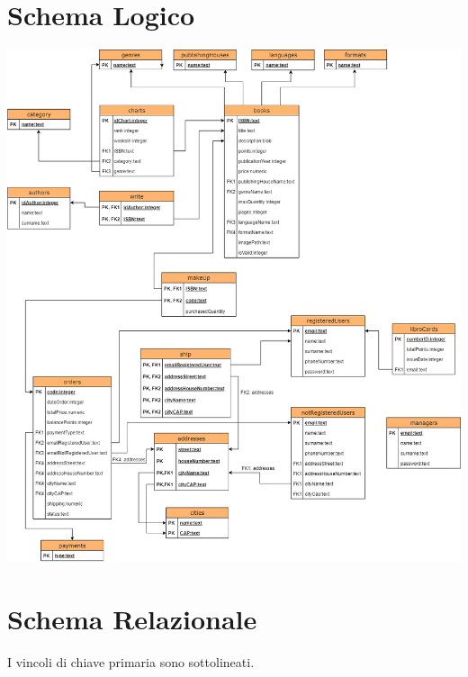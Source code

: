 \documentclass[a4paper,11pt]{report}
\begin{document}
\section{Schema Logico}
\includegraphics[width=1\linewidth]{DB diagrams/Diagramma Logico Database.png}

\section{Schema Relazionale}
I vincoli di chiave primaria sono sottolineati.
\end{document}
